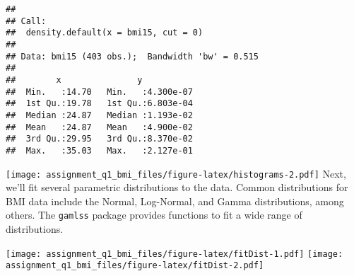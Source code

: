 \begin{verbatim}
## 
## Call:
##  density.default(x = bmi15, cut = 0)
## 
## Data: bmi15 (403 obs.);  Bandwidth 'bw' = 0.515
## 
##        x               y            
##  Min.   :14.70   Min.   :4.300e-07  
##  1st Qu.:19.78   1st Qu.:6.803e-04  
##  Median :24.87   Median :1.193e-02  
##  Mean   :24.87   Mean   :4.900e-02  
##  3rd Qu.:29.95   3rd Qu.:8.370e-02  
##  Max.   :35.03   Max.   :2.127e-01
\end{verbatim}

\begin{Shaded}
\begin{Highlighting}[]
\SpecialCharTok{:::}\SpecialCharTok{$}
                        \NormalTok{(}
                        \NormalTok{(}
                        \NormalTok{)}
\end{Highlighting}
\end{Shaded}

\texttt{[image: assignment\_q1\_bmi\_files/figure-latex/histograms-2.pdf]}
Next, we'll fit several parametric distributions to the data. Common
distributions for BMI data include the Normal, Log-Normal, and Gamma
distributions, among others. The \texttt{gamlss} package provides
functions to fit a wide range of distributions.

\begin{Shaded}
\begin{Highlighting}[]
\NormalTok{(}\NormalTok{, }\NormalTok{, }\NormalTok{(}\NormalTok{,}\NormalTok{), }\NormalTok{(}\NormalTok{,}\NormalTok{), }
\end{Highlighting}
\end{Shaded}

\texttt{[image: assignment\_q1\_bmi\_files/figure-latex/fitDist-1.pdf]}
\texttt{[image: assignment\_q1\_bmi\_files/figure-latex/fitDist-2.pdf]}


